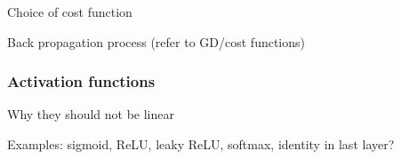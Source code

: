 Choice of cost function

Back propagation process (refer to GD/cost functions)

\subsubsection{Activation functions}
Why they should not be linear

Examples: sigmoid, ReLU, leaky ReLU, softmax, identity in last layer?






